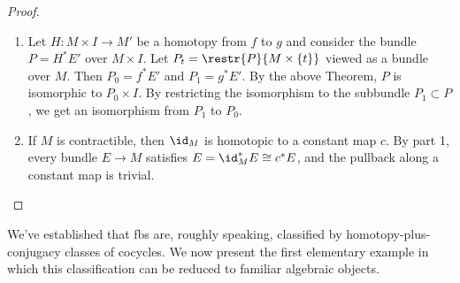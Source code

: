 \begin{proof}
\begin{enumerate}
    \item Let $H:M\times I\to M'$ be a homotopy from $f$ to $g$ and consider the bundle $P=H^\ast E'$ over $M\times I$. Let $P_t=\restr{P}{M\times\{t\}}$ viewed as a bundle over $M$. Then $P_0=f^\ast E'$ and $P_1=g^\ast E'$. By the above Theorem, $P$ is isomorphic to $P_0\times I$. By restricting the isomorphism to the subbundle $P_1\subset P$, we get an isomorphism from $P_1$ to $P_0$.
    \item If $M$ is contractible, then $\id_M$ is homotopic to a constant map $c$. By part 1, every bundle $E\to M$ satisfies $E=\id_M^\ast E\cong c^\ast E$, and the pullback along a constant map is trivial.
\end{enumerate}
\end{proof}


We've established that \glspl{fb} are, roughly speaking, classified by homotopy-plus-conjugacy classes of cocycles. We now present the first elementary example in which this classification can be reduced to familiar algebraic objects.


